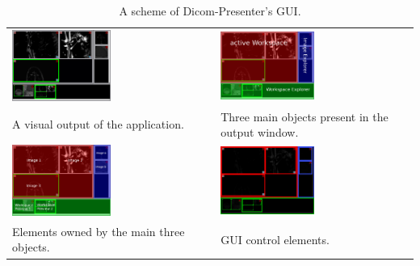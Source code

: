 \begin{table}[ht]
	\caption{A scheme of Dicom-Presenter's GUI.\label{dicompresentergui}}
	\centering
	\begin{tabular}{m{} m{}}
			\includegraphics[width=0.5\textwidth]{Text/IMG/GUI_Screenshot.png}
		&
			\includegraphics[width=0.5\textwidth]{Text/IMG/GUI_Screenshot1_English_Label1.png}
		\\
			A visual output of the application. & Three main objects present in the output window.
		\\
			\includegraphics[width=0.5\textwidth]{Text/IMG/GUI_Screenshot1_English_Label2.png}
		&
			\includegraphics[width=0.5\textwidth]{Text/IMG/GUI_ScreenshotGUI.png}
		\\
			Elements owned by the main three objects.  & GUI control elements.			
		\\
		\end{tabular}
\end{table}%